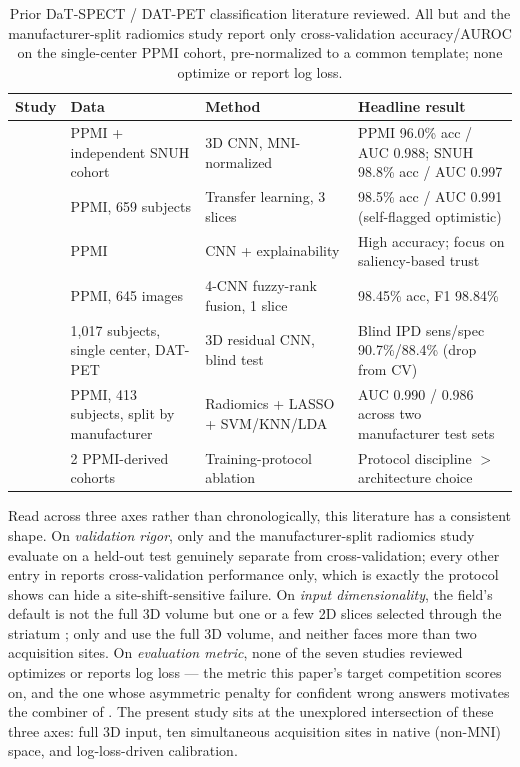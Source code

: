 \documentclass[11pt]{article}
\begin{document}
\begin{table}[t]
\centering
\small
\caption{Prior DaT-SPECT / DAT-PET classification literature reviewed. All but \citet{zhao2022} and the manufacturer-split radiomics study \citep{radiomics2022} report only cross-validation accuracy/AUROC on the single-center PPMI cohort, pre-normalized to a common template; none optimize or report log loss.}
\label{tab:related}
\begin{tabular}{@{}p{2.6cm}p{3.4cm}p{3.9cm}p{3.9cm}@{}}
\toprule
\textbf{Study} & \textbf{Data} & \textbf{Method} & \textbf{Headline result} \\
\midrule
\citet{choi2017} & PPMI + independent SNUH cohort & 3D CNN, MNI-normalized & PPMI 96.0\% acc / AUC 0.988; SNUH 98.8\% acc / AUC 0.997 \\
\citet{quan2019} & PPMI, 659 subjects & Transfer learning, 3 slices & 98.5\% acc / AUC 0.991 (self-flagged optimistic) \\
\citet{nazari2021} & PPMI & CNN + explainability & High accuracy; focus on saliency-based trust \\
\citep{ensemblefusion2022} & PPMI, 645 images & 4-CNN fuzzy-rank fusion, 1 slice & 98.45\% acc, F1 98.84\% \\
\citet{zhao2022} & 1{,}017 subjects, single center, DAT-PET & 3D residual CNN, blind test & Blind IPD sens/spec 90.7\%/88.4\% (drop from CV) \\
\citep{radiomics2022} & PPMI, 413 subjects, split by manufacturer & Radiomics + LASSO + SVM/KNN/LDA & AUC 0.990 / 0.986 across two manufacturer test sets \\
\citep{trainingprotocol2026} & 2 PPMI-derived cohorts & Training-protocol ablation & Protocol discipline $>$ architecture choice \\
\bottomrule
\end{tabular}
\end{table}

Read across three axes rather than chronologically, this literature has a consistent shape. On \emph{validation rigor}, only \citet{zhao2022} and the manufacturer-split radiomics study \citep{radiomics2022} evaluate on a held-out test genuinely separate from cross-validation; every other entry in  reports cross-validation performance only, which is exactly the protocol  shows can hide a site-shift-sensitive failure. On \emph{input dimensionality}, the field's default is not the full 3D volume but one or a few 2D slices selected through the striatum \citep{quan2019,ensemblefusion2022}; only \citet{choi2017} and \citet{zhao2022} use the full 3D volume, and neither faces more than two acquisition sites. On \emph{evaluation metric}, none of the seven studies reviewed optimizes or reports log loss --- the metric this paper's target competition scores on, and the one whose asymmetric penalty for confident wrong answers motivates the combiner of . The present study sits at the unexplored intersection of these three axes: full 3D input, ten simultaneous acquisition sites in native (non-MNI) space, and log-loss-driven calibration.
\end{document}
